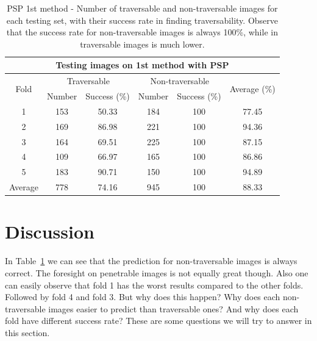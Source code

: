 \documentclass[12pt,a4paper,table,dvipsnames,tikz]{report}
\newcommand{\acronym}{\MakeUppercase}
\newcommand{\bl}[1]{{\hypersetup{linkcolor=blue}#1}}
\begin{document}
	\begin{table}[h!]
		\centering
		\begin{tabular}{|c|c|c|c|c||c|}
			\hline
			\multicolumn{6}{|c|}{Testing images on 1st method with \acronym{psp}}\\
			\hline
			\multirow{2}{*}{Fold} & \multicolumn{2}{c}{Traversable} 
			& \multicolumn{2}{|c||}{Non-traversable} & \multirow{2}{*}{Average (\%)}\\
			& Number & Success (\%) & Number & Success (\%) &\\ 
			\hline\hline
			1 & 153 & 50.33 & 184 & 100 & 77.45\\
			\hline
			2 & 169 & 86.98 & 221 & 100 & 94.36\\
			\hline
			3 & 164 & 69.51 & 225 & 100 & 87.15\\
			\hline
			4 & 109 & 66.97 & 165 & 100 & 86.86\\
			\hline
			5 & 183 & 90.71 & 150 & 100 & 94.89\\
			\hline\hline
			Average & 778 & 74.16 & 945 & 100 & 88.33\\
			\hline
		\end{tabular}
		\caption{\acronym{psp} 1st method - Number of traversable and non-traversable 
			images for each testing set, with their success rate in finding traversability. 
			Observe that the success rate for non-traversable images is always 100\%, 
			while in traversable images is much lower.}
		\label{table:psp:1st}
	\end{table}
	
	\section{Discussion}
	\label{sec:exp:dis}
	
	In Table~\bl{\ref{table:psp:1st}} we can see that the prediction for non-traversable 
	images is always correct. The foresight on penetrable images is not equally great though. 
	Also one can easily observe that fold 1 has the worst results compared to the other 
	folds. Followed by fold 4 and fold 3. But why does this happen? Why does each non-traversable 
	images easier to predict than traversable ones? And why does each fold have different 
	success rate? These are some questions we will try to answer in this section.
	\\
	
\end{document}
